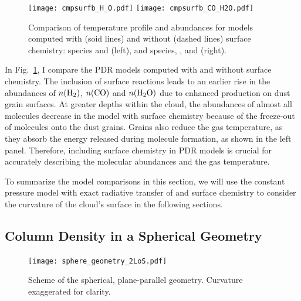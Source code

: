 \documentclass[12pt,a4paper]{article}
\newcommand{\mdpdr}{\texttt{MeudonPDR} code}
\begin{document}
\begin{figure}[hb]
    \centering
    \texttt{[image: cmpsurfb\_H\_O.pdf]}
    \texttt{[image: cmpsurfb\_CO\_H2O.pdf]}
    \caption{Comparison of temperature profile and abundances for models computed with (soid lines) and without (dashed lines) surface chemistry:  species and  (left), and  species, , and  (right).} \label{fig:cmpsurfb}
\end{figure}

In Fig.~\ref{fig:cmpsurfb}, I compare the PDR models computed with and without surface chemistry. The inclusion of surface reactions leads to an earlier rise in the abundances of $n(\ce{H2})$, $n(\ce{CO})$ and $n(\ce{H2O})$ due to enhanced production on dust grain surfaces. At greater depths within the cloud, the abundances of almost all molecules decrease in the model with surface chemistry because of the freeze-out of molecules onto the dust grains. Grains also reduce the gas temperature, as they absorb the energy released during molecule formation, as shown in the left panel. Therefore, including surface chemistry in PDR models is crucial for accurately describing the molecular abundances and the gas temperature.

To summarize the model comparisons in this section, we will use the constant pressure model with exact radiative transfer of  and surface chemistry to consider the curvature of the cloud's surface in the following sections.

\subsection{Column Density in a Spherical Geometry}
\begin{figure}
    \centering
    \texttt{[image: sphere\_geometry\_2LoS.pdf]}
    \caption{Scheme of the spherical, plane-parallel geometry. Curvature exaggerated for clarity.} \label{fig:geometry}
\end{figure}

\end{document}
